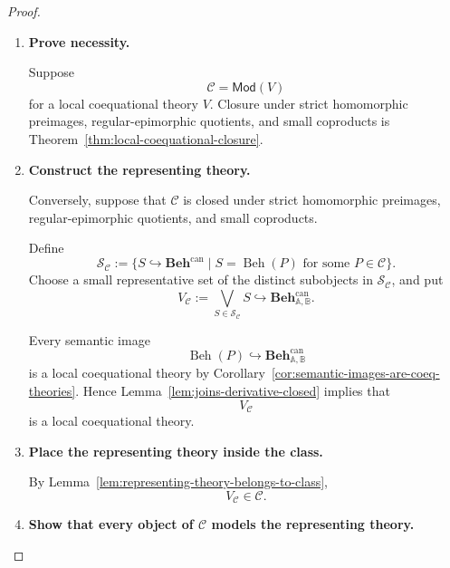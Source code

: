 \begin{proof}
    \leavevmode
    \begin{enumerate}
        \item \textbf{Prove necessity.}

        Suppose
        \[
            \mathcal C=\mathsf{Mod}(V)
        \]
        for a local coequational theory \(V\). Closure under strict
        homomorphic preimages, regular-epimorphic quotients, and small
        coproducts is
        Theorem~\ref{thm:local-coequational-closure}.

        \item \textbf{Construct the representing theory.}

        Conversely, suppose that \(\mathcal C\) is closed under strict
        homomorphic preimages, regular-epimorphic quotients, and small
        coproducts.

        Define
        \[
            \mathcal S_{\mathcal C}
            :=
            \{
                S\hookrightarrow\mathbf{Beh}^{\mathrm{can}}
                \mid
                S=\operatorname{Beh}(P)
                \text{ for some }P\in\mathcal C
            \}.
        \]
        Choose a small representative set of the distinct subobjects in
        \(\mathcal S_{\mathcal C}\), and put
        \[
            V_{\mathcal C}
            :=
            \bigvee_{S\in\mathcal S_{\mathcal C}}S
            \hookrightarrow
            \mathbf{Beh}^{\mathrm{can}}_{\mathbb A,\mathbb B}.
        \]

        Every semantic image
        \[
            \operatorname{Beh}(P)
            \hookrightarrow
            \mathbf{Beh}^{\mathrm{can}}_{\mathbb A,\mathbb B}
        \]
        is a local coequational theory by
        Corollary~\ref{cor:semantic-images-are-coeq-theories}. Hence
        Lemma~\ref{lem:joins-derivative-closed} implies that
        \[
            V_{\mathcal C}
        \]
        is a local coequational theory.

        \item \textbf{Place the representing theory inside the class.}

        By
        Lemma~\ref{lem:representing-theory-belongs-to-class},
        \[
            V_{\mathcal C}\in\mathcal C.
        \]

        \item \textbf{Show that every object of \(\mathcal C\) models the
        representing theory.}


\end{enumerate}
\end{proof}
